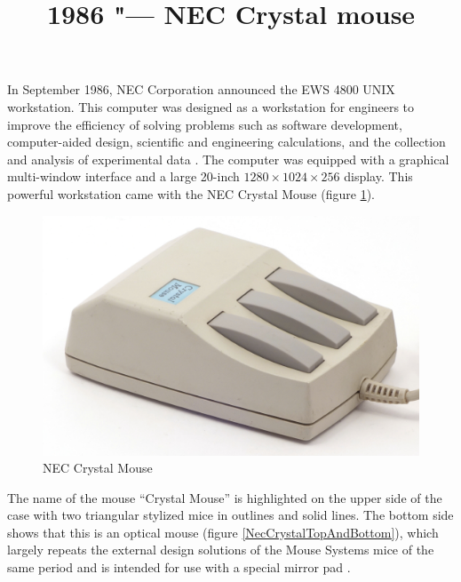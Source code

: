 \documentclass[11pt, a4paper]{article}
\begin{document}
\title{1986 "--- NEC Crystal mouse}
\date{}
\maketitle
{}
In September 1986, NEC Corporation announced the EWS 4800 UNIX workstation. This computer was designed as a workstation for engineers to improve the efficiency of solving problems such as software development, computer-aided design, scientific and engineering calculations, and the collection and analysis of experimental data \cite{yt}. The computer was equipped with a graphical multi-window interface and a large 20-inch $1280 \times 1024 \times 256$ display. This powerful workstation came with the NEC Crystal Mouse (figure \ref{fig:NECCrystalPic}).

\begin{figure}[h]
    \centering
    \includegraphics[scale=0.7]{1986_nec_crystal_mouse/necNorm_30.jpg}
    \caption{NEC Crystal Mouse}
    \label{fig:NECCrystalPic}
\end{figure}

The name of the mouse “Crystal Mouse” is highlighted on the upper side of the case with two triangular stylized mice in outlines and solid lines. The bottom side shows that this is an optical mouse (figure \ref{NecCrystalTopAndBottom}), which largely repeats the external design solutions of the Mouse Systems mice of the same period and is intended for use with a special mirror pad \cite{photo}.
\end{document}
